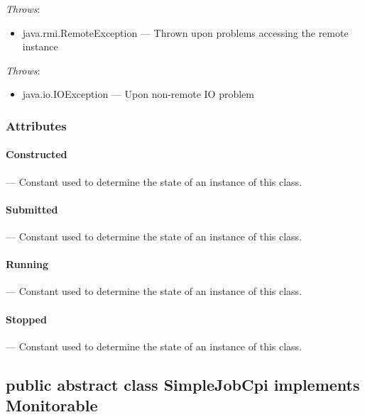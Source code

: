 \documentclass[$Date: 2003/06/26 19:29:31 $]{glabarticle}
\begin{document}
  \textit{Throws}:
 \begin{itemize}
 \item[] java.rmi.RemoteException --- Thrown upon problems accessing the remote instance 
 \end{itemize}
 
\textit{Throws}:
\begin{itemize}
\item[] java.io.IOException --- Upon non-remote IO problem 
\end{itemize}


\subsubsection{Attributes}

\paragraph{Constructed} --- Constant used to determine the state of an instance of this class. \\

\paragraph{Submitted} --- Constant used to determine the state of an instance of this class. \\

\paragraph{Running} --- Constant used to determine the state of an instance of this class. \\

\paragraph{Stopped} --- Constant used to determine the state of an instance of this class. \\


\newpage

\subsection{public abstract class SimpleJobCpi implements Monitorable}
\end{document}
